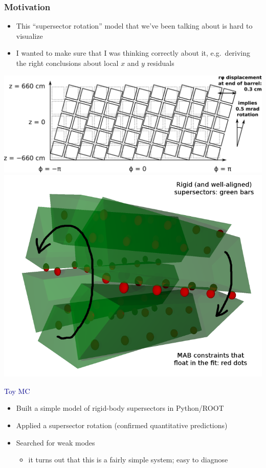 \documentclass[compress]{beamer}
\begin{document}
\begin{frame}
\frametitle{Motivation}
\begin{itemize}
\item This ``supersector rotation'' model that we've been talking about is hard to visualize
\item I wanted to make sure that I was thinking correctly about it, e.g.\
deriving the right conclusions about local $x$ and $y$ residuals
\end{itemize}

\includegraphics[height=2.7 cm]{just_model2.pdf} \includegraphics[height=2.7 cm]{with_twist.png}

\vspace{0.25 cm}
\hspace{-0.83 cm} \textcolor{darkblue}{\large Toy MC}
\begin{itemize}
\item Built a simple model of rigid-body supersectors in Python/ROOT
\item Applied a supersector rotation (confirmed quantitative predictions)
\item Searched for weak modes
\begin{itemize}
\item it turns out that this is a fairly simple system; easy to diagnose
\end{itemize}
\end{itemize}
\end{frame}
\end{document}
